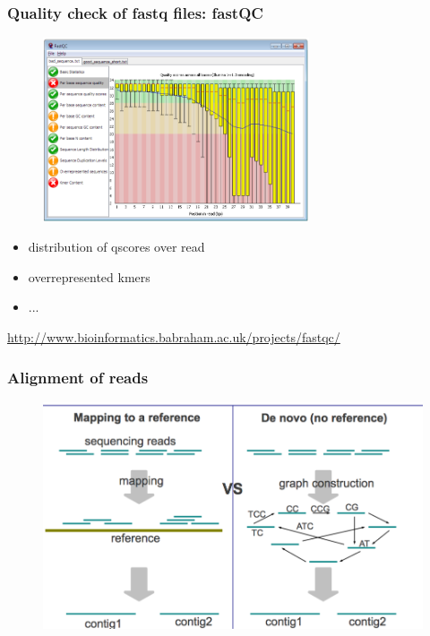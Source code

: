 
\begin{frame}
\frametitle{Quality check of fastq files: fastQC}

        \begin{figure}
                \includegraphics[width=0.7\textwidth]{Pics/fastqc.png}
        \end{figure}

	\tiny{
	\begin{itemize}
		\item distribution of qscores over read
		\item overrepresented kmers
		\item ...
	\end{itemize}
	}

	\begin{center}
		\footnotesize{\url{http://www.bioinformatics.babraham.ac.uk/projects/fastqc/}}
	\end{center}

\end{frame}


\begin{frame}
\frametitle{Alignment of reads}

        \begin{figure}
                \includegraphics[width=\textwidth]{Pics/mapping.png}
        \end{figure}

\end{frame}

